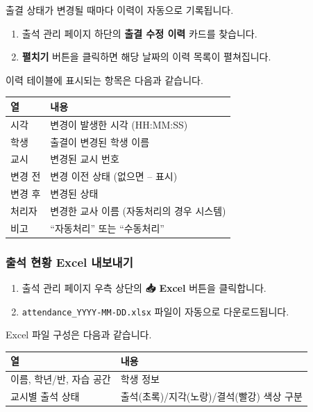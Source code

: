 \documentclass[a4paper,12pt]{article}
\newcommand{\menu}[1]{\textcolor{primary}{\textbf{#1}}}
\begin{document}
출결 상태가 변경될 때마다 이력이 자동으로 기록됩니다.

\begin{enumerate}[leftmargin=1.5em]
    \item 출석 관리 페이지 하단의 \textbf{출결 수정 이력} 카드를 찾습니다.
    \item \menu{펼치기} 버튼을 클릭하면 해당 날짜의 이력 목록이 펼쳐집니다.
\end{enumerate}

이력 테이블에 표시되는 항목은 다음과 같습니다.

\begin{center}
\begin{tabularx}{\textwidth}{lX}
\toprule
\textbf{열} & \textbf{내용} \\
\midrule
시각 & 변경이 발생한 시각 (HH:MM:SS) \\
학생 & 출결이 변경된 학생 이름 \\
교시 & 변경된 교시 번호 \\
변경 전 & 변경 이전 상태 (없으면 -- 표시) \\
변경 후 & 변경된 상태 \\
처리자 & 변경한 교사 이름 (자동처리의 경우 시스템) \\
비고 & ``자동처리'' 또는 ``수동처리'' \\
\bottomrule
\end{tabularx}
\end{center}

\subsubsection{출석 현황 Excel 내보내기}

\begin{enumerate}[leftmargin=1.5em]
    \item 출석 관리 페이지 우측 상단의 \menu{📥 Excel} 버튼을 클릭합니다.
    \item \texttt{attendance\_YYYY-MM-DD.xlsx} 파일이 자동으로 다운로드됩니다.
\end{enumerate}

Excel 파일 구성은 다음과 같습니다.

\begin{center}
\begin{tabular}{ll}
\toprule
\textbf{열} & \textbf{내용} \\
\midrule
이름, 학년/반, 자습 공간 & 학생 정보 \\
교시별 출석 상태 & 출석(초록)/지각(노랑)/결석(빨강) 색상 구분 \\
\bottomrule
\end{tabular}
\end{center}
\end{document}
